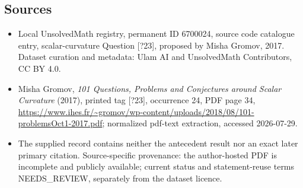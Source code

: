 \documentclass[11pt]{article}
\begin{document}
\subsection{Sources}
\begin{itemize}
\item Local UnsolvedMath registry, permanent ID 6700024, source code catalogue entry, scalar-curvature Question [?23], proposed by Misha Gromov, 2017. Dataset curation and metadata: Ulam AI and UnsolvedMath Contributors, CC BY 4.0.
\item Misha Gromov, \emph{101 Questions, Problems and Conjectures around Scalar Curvature} (2017), printed tag [?23], occurrence 24, PDF page 34, \url{https://www.ihes.fr/~gromov/wp-content/uploads/2018/08/101-problemsOct1-2017.pdf}; normalized pdf-text extraction, accessed 2026-07-29.
\item The supplied record contains neither the antecedent result nor an exact later primary citation. Source-specific provenance: the author-hosted PDF is incomplete and publicly available; current status and statement-reuse terms NEEDS\_REVIEW, separately from the dataset licence.
\end{itemize}
\end{document}
